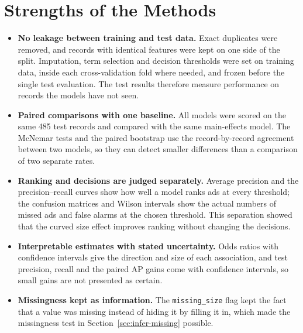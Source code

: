 \section{Strengths of the Methods}
\begin{itemize}
\item \textbf{No leakage between training and test data.} Exact duplicates
  were removed, and records with identical features were kept on one side of
  the split. Imputation, term selection and decision thresholds were set on
  training data, inside each cross-validation fold where needed, and frozen
  before the single test evaluation. The test results therefore measure
  performance on records the models have not seen.
\item \textbf{Paired comparisons with one baseline.} All models were scored
  on the same 485 test records and compared with the same main-effects
  model. The McNemar tests and the paired bootstrap use the record-by-record
  agreement between two models, so they can detect smaller differences than
  a comparison of two separate rates.
\item \textbf{Ranking and decisions are judged separately.} Average
  precision and the precision--recall curves show how well a model ranks ads
  at every threshold; the confusion matrices and Wilson intervals show the
  actual numbers of missed ads and false alarms at the chosen threshold. This
  separation showed that the curved size effect improves ranking without
  changing the decisions.
\item \textbf{Interpretable estimates with stated uncertainty.} Odds ratios
  with confidence intervals give the direction and size of each association,
  and test precision, recall and the paired AP gains come with confidence
  intervals, so small gains are not presented as certain.
\item \textbf{Missingness kept as information.} The \texttt{missing\_size}
  flag kept the fact that a value was missing instead of hiding it by filling
  it in, which made the missingness test in Section~\ref{sec:infer-missing}
  possible.
\end{itemize}

